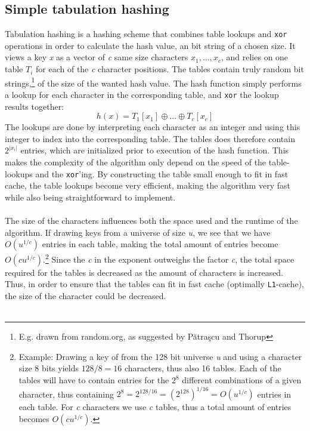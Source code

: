 \documentclass[11pt]{report} %
\begin{document}
\subsection{Simple tabulation hashing}
\label{subsec:background_simple_tabulation_hashing}
Tabulation hashing is a hashing scheme that combines table lookups and \verb|xor| operations in order to calculate the hash value, an bit string of a chosen size. It views a key \emph{x} as a vector of \emph{c} same size characters $x_1, ..., x_c$, and relies on one table $T_i$ for each of the \emph{c} character positions. The tables contain truly random bit strings,\footnote{E.g. drawn from random.org, as suggested by Pătraşcu and Thorup} of the size of the wanted hash value. The hash function simply performs a lookup for each character in the corresponding table, and \verb|xor| the lookup results together:
$$h(x) = T_1[x_1] \oplus ... \oplus T_c[x_c]$$
The lookups are done by interpreting each character as an integer and using this integer to index into the corresponding table. The tables does therefore contain $2^{|x_i|}$ entries, which are initialized prior to execution of the hash function. This makes the complexity of the algorithm only depend on the speed of the table-lookups and the \verb|xor|'ing. By constructing the table small enough to fit in fast cache, the table lookups become very efficient, making the algorithm very fast while also being straightforward to implement.\\
\\
The size of the characters influences both the space used and the runtime of the algorithm. If drawing keys from a universe of size \emph{u}, we see that we have $O(u^{1/c})$ entries in each table, making the total amount of entries become $O(cu^{1/c})$.\footnote{Example: Drawing a key of from the 128 bit universe \emph{u} and using a character size 8 bits yields $128/8=16$ characters, thus also 16 tables. Each of the tables will have to contain entries for the $2^8$ different combinations of a given character, thus containing $2^8 = 2^{128/16} = (2^{128})^{1/16} = O(u^{1/c})$ entries in each table. For \emph{c} characters we use \emph{c} tables, thus a total amount of entries becomes $O(cu^{1/c})$.} Since the \emph{c} in the exponent outweighs the factor \emph{c}, the total space required for the tables is decreased as the amount of characters is increased. Thus, in order to ensure that the tables can fit in fast cache (optimally \verb|L1|-cache), the size of the character could be decreased. \\
\\
\end{document}
